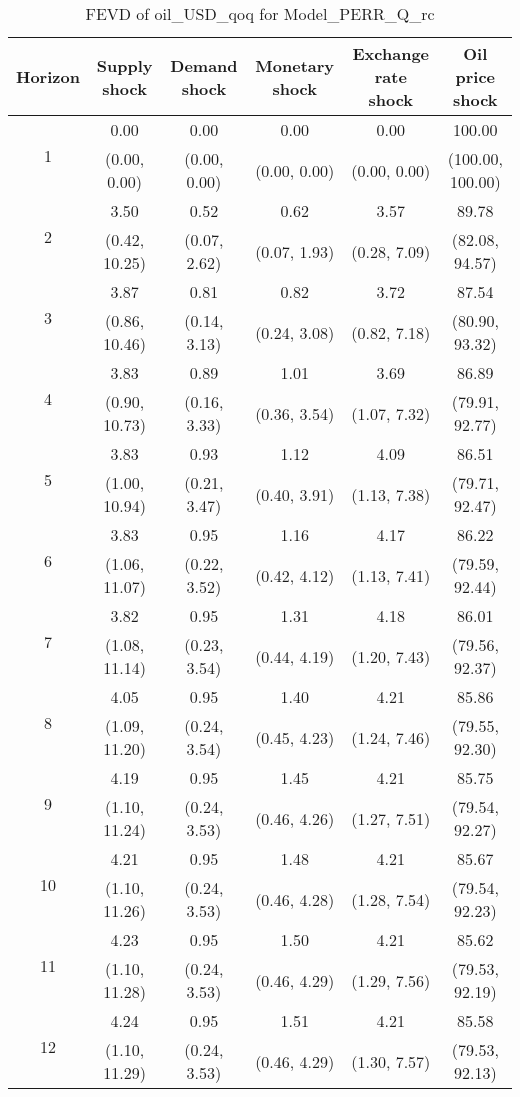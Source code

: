\documentclass{article}
\begin{document}
\begin{table}
	\footnotesize
	\caption{FEVD of oil_USD_qoq for Model_PERR_Q_rc}
	\begin{tabular}{cccccc}
		Horizon & Supply shock & Demand shock & Monetary shock & Exchange rate shock & Oil price shock\\ \hline
		\multirow{2}{*}{1} & 0.00 & 0.00 & 0.00 & 0.00 & 100.00\\
		 & (0.00, 0.00) & (0.00, 0.00) & (0.00, 0.00) & (0.00, 0.00) & (100.00, 100.00)\\
		\multirow{2}{*}{2} & 3.50 & 0.52 & 0.62 & 3.57 & 89.78\\
		 & (0.42, 10.25) & (0.07, 2.62) & (0.07, 1.93) & (0.28, 7.09) & (82.08, 94.57)\\
		\multirow{2}{*}{3} & 3.87 & 0.81 & 0.82 & 3.72 & 87.54\\
		 & (0.86, 10.46) & (0.14, 3.13) & (0.24, 3.08) & (0.82, 7.18) & (80.90, 93.32)\\
		\multirow{2}{*}{4} & 3.83 & 0.89 & 1.01 & 3.69 & 86.89\\
		 & (0.90, 10.73) & (0.16, 3.33) & (0.36, 3.54) & (1.07, 7.32) & (79.91, 92.77)\\
		\multirow{2}{*}{5} & 3.83 & 0.93 & 1.12 & 4.09 & 86.51\\
		 & (1.00, 10.94) & (0.21, 3.47) & (0.40, 3.91) & (1.13, 7.38) & (79.71, 92.47)\\
		\multirow{2}{*}{6} & 3.83 & 0.95 & 1.16 & 4.17 & 86.22\\
		 & (1.06, 11.07) & (0.22, 3.52) & (0.42, 4.12) & (1.13, 7.41) & (79.59, 92.44)\\
		\multirow{2}{*}{7} & 3.82 & 0.95 & 1.31 & 4.18 & 86.01\\
		 & (1.08, 11.14) & (0.23, 3.54) & (0.44, 4.19) & (1.20, 7.43) & (79.56, 92.37)\\
		\multirow{2}{*}{8} & 4.05 & 0.95 & 1.40 & 4.21 & 85.86\\
		 & (1.09, 11.20) & (0.24, 3.54) & (0.45, 4.23) & (1.24, 7.46) & (79.55, 92.30)\\
		\multirow{2}{*}{9} & 4.19 & 0.95 & 1.45 & 4.21 & 85.75\\
		 & (1.10, 11.24) & (0.24, 3.53) & (0.46, 4.26) & (1.27, 7.51) & (79.54, 92.27)\\
		\multirow{2}{*}{10} & 4.21 & 0.95 & 1.48 & 4.21 & 85.67\\
		 & (1.10, 11.26) & (0.24, 3.53) & (0.46, 4.28) & (1.28, 7.54) & (79.54, 92.23)\\
		\multirow{2}{*}{11} & 4.23 & 0.95 & 1.50 & 4.21 & 85.62\\
		 & (1.10, 11.28) & (0.24, 3.53) & (0.46, 4.29) & (1.29, 7.56) & (79.53, 92.19)\\
		\multirow{2}{*}{12} & 4.24 & 0.95 & 1.51 & 4.21 & 85.58\\
		 & (1.10, 11.29) & (0.24, 3.53) & (0.46, 4.29) & (1.30, 7.57) & (79.53, 92.13)\\
	\end{tabular}
\label{tab:fevd-Model_PERR_Q_rc-oil_USD_qoq}
\end{table}
\end{document}
